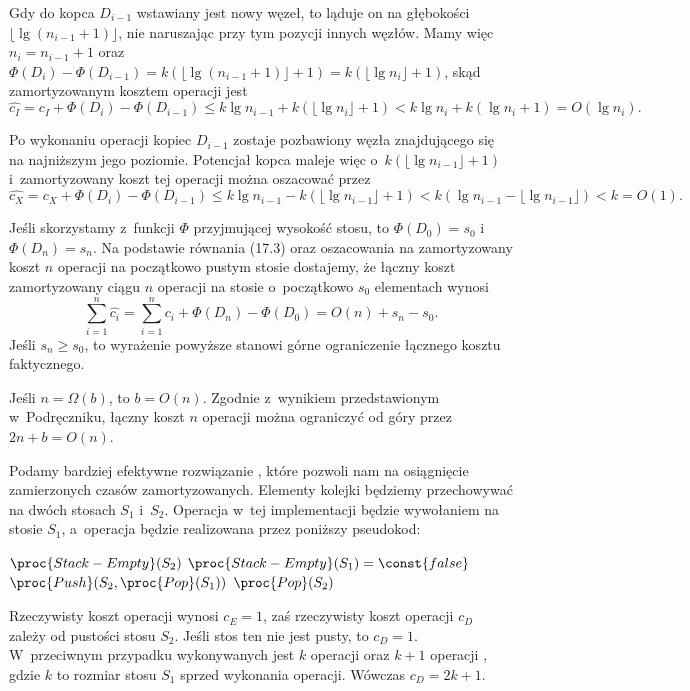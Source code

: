 Gdy do kopca $D_{i-1}$ wstawiany jest nowy węzeł, to ląduje on na głębokości $\lfloor\lg(n_{i-1}+1)\rfloor$, nie naruszając przy tym pozycji innych węzłów.
Mamy więc $n_i=n_{i-1}+1$ oraz $\Phi(D_i)-\Phi(D_{i-1})=k(\lfloor\lg(n_{i-1}+1)\rfloor+1)=k(\lfloor\lg n_i\rfloor+1)$, skąd zamortyzowanym kosztem operacji  jest
\[
	\widehat{c_I} = c_I+\Phi(D_i)-\Phi(D_{i-1}) \le k\lg n_{i-1}+k(\lfloor\lg n_i\rfloor+1) < k\lg n_i+k(\lg n_i+1) = O(\lg n_i).
\]

Po wykonaniu operacji  kopiec $D_{i-1}$ zostaje pozbawiony węzła znajdującego się na najniższym jego poziomie.
Potencjał kopca maleje więc o~$k(\lfloor\lg n_{i-1}\rfloor+1)$ i~zamortyzowany koszt tej operacji można oszacować przez
\[
	\widehat{c_X} = c_X+\Phi(D_i)-\Phi(D_{i-1}) \le k\lg n_{i-1}-k(\lfloor\lg n_{i-1}\rfloor+1) < k(\lg n_{i-1}-\lfloor\lg n_{i-1}\rfloor) < k = O(1).
\]

\exercise %
Jeśli skorzystamy z~funkcji $\Phi$ przyjmującej wysokość stosu, to $\Phi(D_0)=s_0$ i~$\Phi(D_n)=s_n$.
Na podstawie równania (17.3) oraz oszacowania na zamortyzowany koszt $n$ operacji na początkowo pustym stosie dostajemy, że łączny koszt zamortyzowany ciągu $n$ operacji na stosie o~początkowo $s_0$ elementach wynosi
\[
	\sum_{i=1}^n\widehat{c_i} = \sum_{i=1}^nc_i+\Phi(D_n)-\Phi(D_0) = O(n)+s_n-s_0.
\]
Jeśli $s_n\ge s_0$, to wyrażenie powyższe stanowi górne ograniczenie łącznego kosztu faktycznego.

\exercise %
Jeśli $n=\Omega(b)$, to $b=O(n)$.
Zgodnie z~wynikiem przedstawionym w~Podręczniku, łączny koszt $n$ operacji  można ograniczyć od góry przez $2n+b=O(n)$.

\exercise %
Podamy bardziej efektywne rozwiązanie , które pozwoli nam na osiągnięcie zamierzonych czasów zamortyzowanych.
Elementy kolejki będziemy przechowywać na dwóch stosach $S_1$ i~$S_2$.
Operacja  w~tej implementacji będzie wywołaniem  na stosie $S_1$, a~operacja  będzie realizowana przez poniższy pseudokod:
\begin{codebox}
\li	\If $\proc{Stack-Empty}(S_2)$
\li		\Then \While $\proc{Stack-Empty}(S_1)=\const{false}$
\li				\Do $\proc{Push}(S_2,\proc{Pop}(S_1))$
				\End
		\End
\li	\Return $\proc{Pop}(S_2)$
\end{codebox}
Rzeczywisty koszt operacji  wynosi $c_E=1$, zaś rzeczywisty koszt operacji  $c_D$ zależy od pustości stosu $S_2$.
Jeśli stos ten nie jest pusty, to $c_D=1$.
W~przeciwnym przypadku wykonywanych jest $k$ operacji  oraz $k+1$ operacji , gdzie $k$ to rozmiar stosu $S_1$ sprzed wykonania operacji.
Wówczas $c_D=2k+1$.

